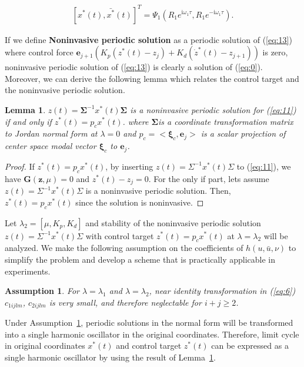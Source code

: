 \documentclass[openacc]{rsproca_new}%
\def\vec#1{\ensuremath{\mathbf{#1}}}
\newcommand{\Eref}[1]{(\ref{#1})}
\newcommand{\asref}[1]{Assumption~\ref{#1}}
\newcommand{\Lref}[1]{Lemma~\ref{#1}}
\newtheorem{lemma}{\bf Lemma}[section]
\newtheorem{assumption}{\bf Assumption}[section]
\begin{document}
\begin{align}\label{eq:16}
    [x^*(t),\bar {x^*}(t)]^T=\Psi_1(R_1e^{\textrm{i}\omega_1 \tau},R_1e^{-\textrm{i}\omega_1 \tau}).
\end{align}

\noindent If we define \textbf{Noninvasive periodic solution} as a periodic solution of \Eref{eq:13} where control force $\vec{e}_{j+1}(K_p(z^*(t)-z_j)+K_d(\dot z^*(t)-z_{j+1}))$ is zero, noninvasive periodic solution of \Eref{eq:13} is clearly a solution of \Eref{eq:0}. Moreover, we can derive the following lemma which relates the control target and the noninvasive periodic solution.

\begin{lemma}\label{l1}
$z(t)=\vec{\Sigma}^{-1}x^*(t)\vec{\Sigma}$ is a noninvasive periodic solution for \Eref{eq:11} if and only if $z^*(t)=p_c x^*(t)$.
where $\vec{\Sigma}$is a coordinate transformation matrix to Jordan normal form at $\lambda=0$ and $p_c=<\vec{\xi}_c,\vec{e}_{j}>$ is a scalar projection of center space modal vector $\vec{\xi}_c$ to $\vec{e}_{j}$.
\end{lemma}

\begin{proof}
If $z^*(t)=p_cx^*(t)$, by inserting $z(t)=\Sigma^{-1}x^*(t)\Sigma$ to \Eref{eq:11}, we have $\vec{G}(\vec{z},\mu)=0$ and $z^*(t)-z_j=0$. For the only if part, lets assume $z(t)=\Sigma^{-1}x^*(t)\Sigma$ is a noninvasive periodic solution. Then, $z^*(t)=p_cx^*(t)$ since the solution is noninvasive.
\end{proof}

\noindent Let $\lambda_2=[\mu,K_p,K_d]$ and stability of the noninvasive periodic solution $z(t)=\Sigma^{-1}x^*(t)\Sigma$ with control target $z^*(t)=p_cx^*(t)$  at $\lambda=\lambda_2$ will be analyzed. We make the following assumption on the coefficients of $h(u,\bar u,\nu)$ to simplify the problem and develop a scheme that is practically applicable in experiments.

\begin{assumption}\label{a1}
For $\lambda=\lambda_1$ and $\lambda=\lambda_2$, near identity transformation in \Eref{eq:6} $c_{1ijlm}$, $c_{2ijlm}$ is very small, and therefore neglectable for $i+j\geq 2$.
\end{assumption}

\noindent  Under \asref{a1}, periodic solutions in the normal form will be transformed into a single harmonic oscillator in the original coordinates. Therefore, limit cycle in original coordinates $x^*(t)$ and control target  $z^*(t)$ can be expressed as a single harmonic oscillator by using the result of \Lref{l1}.
\end{document}
